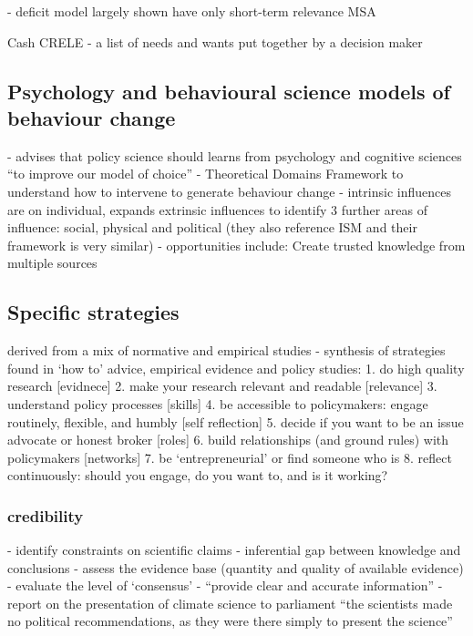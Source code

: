 \cite[p24-5]{BA2024trust} - deficit model largely shown have only short-term relevance 
MSA

Cash CRELE
\cite{Bisbal2024} - a list of needs and wants put together by a decision maker

\subsection{Psychology and behavioural science models of behaviour change}
\cite{CairneyW2017} - advises that policy science should learns from psychology and cognitive sciences ``to improve our model of choice''
\cite{AtkinsFIOPIFDCGLM2017} - Theoretical Domains Framework to understand how to intervene to generate behaviour change
\cite{HamptonW2023} - intrinsic influences are on individual, expands extrinsic influences to identify 3 further areas of influence: social, physical and political (they also reference ISM and their framework is very similar)
\cite{MoallemiZHSMZHKHMGLB2023} - opportunities include: Create trusted knowledge from multiple sources

\subsection{Specific strategies}
derived from a mix of normative and empirical studies
\cite{OliverC2019} - synthesis of strategies found in `how to' advice, empirical evidence and policy studies:
1. do high quality research [evidnece]
2. make your research relevant and readable [relevance]
3. understand policy processes [skills]
4. be accessible to policymakers: engage routinely, flexible, and humbly [self reflection]
5. decide if you want to be an issue advocate or honest broker [roles]
6. build relationships (and ground rules) with policymakers [networks]
7. be `entrepreneurial' or find someone who is 
8. reflect continuously: should you engage, do you want to, and is it working?



\subsubsection{credibility}
\cite{GluckmanBK2021} - identify constraints on scientific claims - inferential gap between knowledge and conclusions
\cite{GluckmanBK2021} - assess the evidence base (quantity and quality of available evidence)
\cite{GluckmanBK2021} - evaluate the level of `consensus'
\cite{ElsensohnACDGGKPRS2019} - ``provide clear and accurate information''
\cite{Horton2022} - report on the presentation of climate science to parliament ``the scientists made no political recommendations, as they were there simply to present the science''


